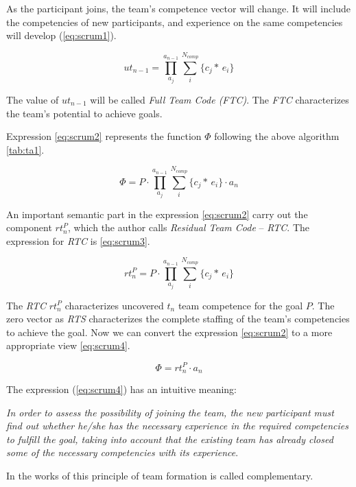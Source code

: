 \documentclass[12pt]{report}
\theoremstyle{definition}
\begin{document}
As the participant joins, the team's competence vector will change.
It will include the competencies of new participants, and experience on the same competencies will develop (\ref{eq:scrum1}).

\begin{equation} 
\label{eq:scrum1}
ut_{n-1} = \prod_{a_j}^{a_{n-1}}\sum_i^{N_{comp}}\bigg\{c_j * \, e_i \bigg\}
\end{equation}

The value of $ut_{n-1}$ will be called \emph{Full Team Code (FTC)}. 
The \emph{FTC} characterizes the team's potential to achieve goals.

Expression \ref{eq:scrum2} represents the function $\Phi$ following the above algorithm \ref{tab:ta1}.

\begin{equation} 
\label{eq:scrum2}
\Phi  = P \cdot \prod_{a_j}^{a_{n-1}}\sum_i^{N_{comp}} \bigg\{c_j *\, e_i \bigg\} \cdot a_n
\end{equation}

An important semantic part in the expression \ref{eq:scrum2} carry out the component $rt^P_n$, which the author calls \emph{Residual Team  Code} -- \emph{RTC}. 
The expression for \emph{RTC} is \ref{eq:scrum3}.

\begin{equation} 
\label{eq:scrum3}
rt_n^P  = P \cdot \prod_{a_j}^{a_{n-1}}\sum_i^{N_{comp}} \bigg\{c_j *\, e_i \bigg\}
\end{equation}

The \emph{RTC} $rt_n^P$ characterizes uncovered  $t_n$ team competence for the goal  $P$. 
The zero vector as \emph{RTS} characterizes the complete staffing of the team's competencies to achieve the goal.
Now we can convert the expression \ref{eq:scrum2} to a more appropriate view \ref{eq:scrum4}.

\begin{equation} 
\label{eq:scrum4}
\Phi  =  rt_n^P \cdot a_n 
\end{equation}

The expression (\ref{eq:scrum4}) has an intuitive meaning: 

\emph{In order to assess the possibility of joining the team, the new participant must find out whether he/she has the necessary experience in the required competencies to fulfill the goal, taking into account that the existing team has already closed some of the necessary competencies with its experience}. 

In the works of \cite{hamilton2003team, prat2002should} this principle of team formation is called complementary.
\end{document}
